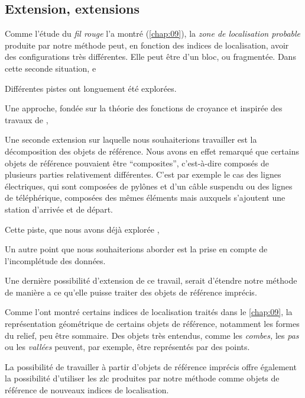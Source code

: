 \subsection*{Extension, extensions}


Comme l'étude du \emph{fil rouge} l'a montré (\autoref{chap:09}), la
\emph{zone de localisation probable} produite par notre méthode peut,
en fonction des indices de localisation, avoir des configurations très
différentes. Elle peut être d'un bloc, ou fragmentée. Dans cette
seconde situation,  e


Différentes pistes ont longuement été explorées.

Une approche, fondée sur la théorie des fonctions de croyance
\autocite{Shafer1976} et inspirée des travaux de
\textcite{Olteanu2008},


Une seconde extension sur laquelle nous souhaiterions travailler est
la décomposition des objets de référence. Nous avons en effet remarqué
que certains objets de référence pouvaient être \enquote{composites},
c'est-à-dire composés de plusieurs parties relativement
différentes. C'est par exemple le cas des lignes électriques, qui sont
composées de pylônes et d'un câble suspendu ou des lignes de
téléphérique, composées des mêmes éléments mais auxquels s'ajoutent
une station d'arrivée et de départ.

Cette piste, que nous avons
déjà explorée \autocite{Bunel2019a},

Un autre point que nous souhaiterions aborder est la prise en compte
de l'incomplétude des données.

Une dernière possibilité d'extension de ce travail, serait d'étendre
notre méthode de manière a ce qu'elle puisse traiter des objets de
référence imprécis.

Comme l'ont montré certains indices de localisation traités dans le
\autoref{chap:09}, la représentation géométrique de certains objets de
référence, notamment les formes du relief, peu être sommaire. Des
objets très entendus, comme les \emph{combes,} les \emph{pas} ou les
\emph{vallées} peuvent, par exemple, être représentés par des points.


La possibilité de travailler à partir d'objets de référence imprécis
offre également la possibilité d'utiliser les \ac{zlc} produites par
notre méthode comme objets de référence de nouveaux indices de
localisation.

